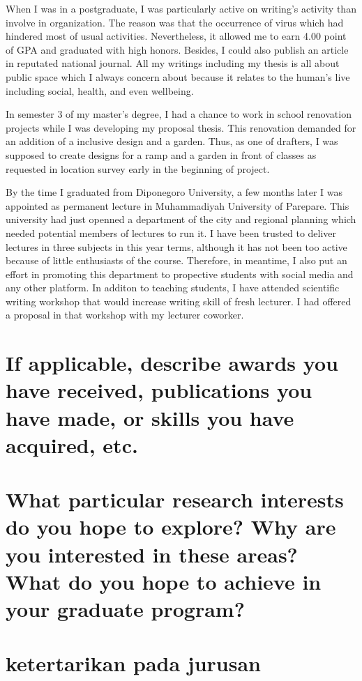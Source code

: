 \documentclass[11pt]{simart} %
\begin{document}
When I was in a postgraduate, I was particularly active on writing's activity than involve in organization. The reason was that the occurrence of virus which had hindered most of usual activities. Nevertheless, it allowed me to earn 4.00 point of GPA and graduated with high honors. Besides, I could also publish an article in reputated national journal. All my writings including my thesis is all about public space which I always concern about because it relates to the human's live including social, health, and even wellbeing.

In semester 3 of my master's degree, I had a chance to work in school renovation projects while I was developing my proposal thesis. This renovation demanded for an addition of a inclusive design and a garden. Thus, as one of drafters, I was supposed to create designs for a ramp and a garden in front of classes as requested in location survey early in the beginning of project. %

By the time I graduated from Diponegoro University, a few months later I was appointed as permanent lecture in Muhammadiyah University of Parepare.
This university had just openned a department of the city and regional planning which needed potential members of lectures to run it.
I have been trusted to deliver lectures in three subjects in this year terms, although it has not been too active because of little enthusiasts of the course.
Therefore, in meantime, I also put an effort in promoting this department to propective students with social media and any other platform.
In additon to teaching students, I have attended scientific writing workshop that would increase writing skill of fresh lecturer. I had offered a proposal in that workshop with my lecturer coworker.




\section{If applicable, describe awards you have received, publications you have made, or skills you have acquired, etc.}

\section{What particular research interests do you hope to explore? Why are you interested in these areas? What do you hope to achieve in your graduate program?}
\section*{ketertarikan pada jurusan}
\end{document}

